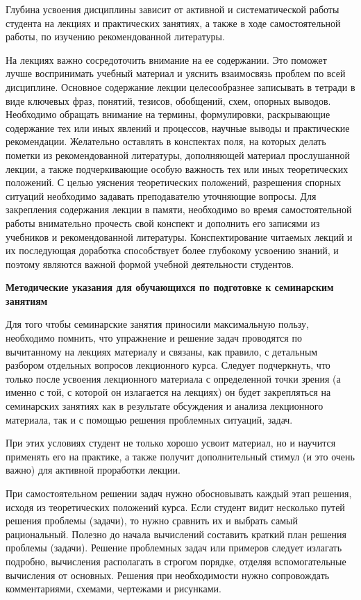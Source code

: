 \documentclass[a4paper, 12pt]{article}
\begin{document}
Глубина усвоения дисциплины зависит от активной и систематической работы студента на лекциях и практических занятиях, а также в ходе самостоятельной работы, по изучению рекомендованной литературы. 

На лекциях важно сосредоточить внимание на ее содержании. Это поможет лучше воспринимать учебный материал и уяснить взаимосвязь проблем по всей дисциплине. Основное содержание лекции целесообразнее записывать в тетради в виде ключевых фраз, понятий, тезисов, обобщений, схем, опорных выводов. Необходимо обращать внимание на термины, формулировки, раскрывающие содержание тех или иных явлений и процессов, научные выводы и практические рекомендации. Желательно оставлять в конспектах поля, на которых делать пометки из рекомендованной литературы, дополняющей материал прослушанной лекции, а также подчеркивающие особую важность тех или иных теоретических положений. С целью уяснения теоретических положений, разрешения спорных ситуаций необходимо задавать преподавателю уточняющие вопросы. Для закрепления содержания лекции в памяти, необходимо во время самостоятельной работы внимательно прочесть свой конспект и дополнить его записями из учебников и рекомендованной литературы. Конспектирование читаемых лекций и их последующая доработка способствует более глубокому усвоению знаний, и поэтому являются важной формой учебной деятельности студентов.

\vspace{8pt}
{\bf Методические указания для обучающихся по подготовке к семинарским занятиям}

Для того чтобы семинарские занятия приносили максимальную пользу, необходимо помнить, что упражнение и решение задач проводятся по вычитанному на лекциях материалу и связаны, как правило, с детальным разбором отдельных вопросов лекционного курса. Следует подчеркнуть, что только после усвоения лекционного материала с определенной точки зрения (а именно с той, с которой он излагается на лекциях) он будет закрепляться на семинарских занятиях как в результате обсуждения и анализа лекционного материала, так и с помощью решения проблемных ситуаций, задач.

При этих условиях студент не только хорошо усвоит материал, но и научится применять его на практике, а также получит дополнительный стимул (и это очень важно) для активной проработки лекции.

При самостоятельном решении задач нужно обосновывать каждый этап решения, исходя из теоретических положений курса. Если студент видит несколько путей решения проблемы (задачи), то нужно сравнить их и выбрать самый рациональный. Полезно до начала вычислений составить краткий план решения проблемы (задачи). Решение проблемных задач или примеров следует излагать подробно, вычисления располагать в строгом порядке, отделяя вспомогательные вычисления от основных. Решения при необходимости нужно сопровождать комментариями, схемами, чертежами и рисунками. 
\end{document}
